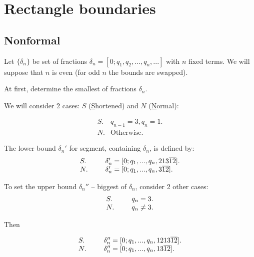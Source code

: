 \documentclass[a4paper, 12pt]{article}
\theoremstyle{definition}
\theoremstyle{definition}
\theoremstyle{proposition}
\theoremstyle{lemma}
\renewcommand{\d}{\delta}
\begin{document}
\section{Rectangle boundaries}
\label{section_boundaries}

\subsection{Nonformal}

Let $\{\d_n\}$ be set of fractions
$\d_n = [0; q_1, q_2, ..., q_n, ...]$ with $n$ fixed terms.
We will suppose that $n$ is even (for odd $n$ the bounds are swapped).

At first, determine the smallest of fractions $\d_n$.

We will consider 2 cases: $S$
(\underline{S}hortened) and $N$ (\underline{N}ormal):

\begin{equation}
	\label{left_shortened_normal}
	\begin{array}{ll}
		S. & q_{n-1} = 3, q_n = 1. \\
		N. & \text{Otherwise.}
	\end{array}
\end{equation}

The lower bound $\d_n'$ for segment, containing $\d_n$, is defined by:
\begin{equation}
	\begin{array}{ll}
		S. & \hspace*{15pt} \d_n' = [0; q_1, ..., q_n, 213\overline{12}]. \\
		N. & \hspace*{15pt} \d_n' = [0; q_1, ..., q_n, 3\overline{12}].
	\end{array}
\end{equation}

To set the upper bound $\d_n''$ -- biggest of $\d_n$, consider 2 other cases:
\begin{equation}
	\begin{array}{ll}
		S. & \hspace*{15pt} q_{n} = 3.\\
		N. & \hspace*{15pt} q_{n} \ne 3.
	\end{array}
\end{equation}

Then

\begin{equation}
	\begin{array}{ll}
		S. & \hspace*{15pt} \d_n'' = [0; q_1, ..., q_n, 1213\overline{12}]. \\
		N. & \hspace*{15pt} \d_n'' = [0; q_1, ..., q_n, 13\overline{12}].
	\end{array}
\end{equation}
\end{document}
